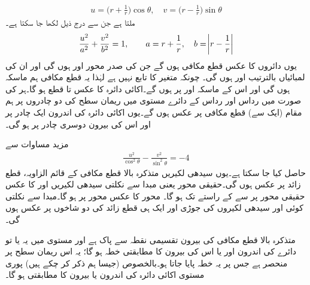 \begin{align}\label{مساوات_نقش_ہوائی_حرکیات_ب}
u=\big(r+\frac{1}{r}\big)\cos \theta,\quad v=\big(r-\frac{1}{r}\big)\sin\theta
\end{align}
ملتا ہے جن سے درج ذیل لکھا جا سکتا ہے۔
\begin{align*}
\frac{u^2}{a^2}+\frac{v^2}{b^2}=1,\quad \quad a=r+\frac{1}{r},\quad b=\abs{r-\frac{1}{r}}
\end{align*}
یوں  دائروں کا عکس قطع مکافی ہوں گے جن کی صدر محور  اور  ہوں گی اور ان کی لمبائیاں بالترتیب  اور  ہوں گی۔ چونکہ  متغیر  کا تابع نہیں ہے لہٰذا یہ قطع مکافی ہم ماسکہ ہوں گی اور اس کے ماسکہ  اور  پر ہوں  گے۔اکائی دائرہ  کا عکس  تا  قطع ہو گا۔ہر  کی صورت میں رداس  اور رداس  کے دائرے   مستوی میں ریمان سطح کی دو چادروں پر ہم مقام (ایک سے)  قطع مکافی پر عکس ہوں گے۔یوں اکائی دائرہ  کی اندرون ایک چادر پر اور اس کی بیرون دوسری چادر پر ہو گی۔

مزید مساوات  سے
\begin{align}
\frac{u^2}{\cos^2\theta}-\frac{v^2}{\sin^2\theta}=-4
\end{align}
حاصل کیا جا سکتا ہے۔یوں سیدھی لکیریں  متذکرہ بالا قطع مکافی کے  قائم الزاویہ، قطع زائد پر عکس ہوں گی۔حقیقی محور یعنی مبدا سے نکلتی سیدھی لکیریں  اور  کا عکس حقیقی محور پر  سے  کے راستے  تک  ہو گا۔  محور کا عکس  محور   پر ہو گا۔مبدا سے نکلتی کوئی اور سیدھی لکیروں کی جوڑی   اور  ایک ہی قطع زائد کی دو شاخوں پر عکس ہوں گی۔

متذکرہ بالا قطع مکافی کی بیرون تقسیمی نقطہ سے پاک ہے اور  مستوی میں یہ یا تو دائرے کی اندرون اور یا اس کی بیرون کا مطابقتی خطہ ہو گا؛ یہ اس ریمان سطح پر منحصر ہے جس پر یہ خطہ پایا جاتا ہو۔بالخصوص (جیسا ہم ذکر کر چکے ہیں) پوری  مستوی اکائی دائرہ  کی اندرون یا بیرون کا مطابقتی ہو گا۔

